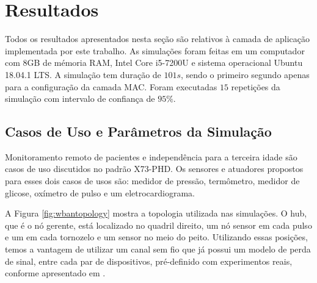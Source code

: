 \section{Resultados}\label{results}
Todos os resultados apresentados nesta seção são relativos à camada de aplicação implementada por este trabalho. As simulações foram feitas em um computador com 8GB de mémoria RAM, Intel Core i5-7200U e sistema operacional Ubuntu 18.04.1 LTS. A simulação tem duração de $101s$, sendo o primeiro segundo apenas para a configuração da camada MAC. Foram executadas $15$ repetições da simulação com intervalo de confiança de $95\%$. 

\subsection{Casos de Uso e Parâmetros da Simulação}

Monitoramento remoto de pacientes e independência para a terceira idade são casos de uso discutidos no padrão X73-PHD. Os sensores e atuadores propostos para esses dois casos de usos são: medidor de pressão, termômetro, medidor de glicose, oxímetro de pulso e um eletrocardiograma.

A Figura \ref{fig:wbantopology} mostra a topologia utilizada nas simulações. O hub, que é o nó gerente, está localizado no quadril direito, um nó sensor em cada pulso e um em cada tornozelo e um sensor no meio do peito. Utilizando essas posições, temos a vantagem de utilizar um canal sem fio que já possui um modelo de perda de sinal, entre cada par de dispositivos, pré-definido com experimentos reais, conforme apresentado em \cite{b4}.

